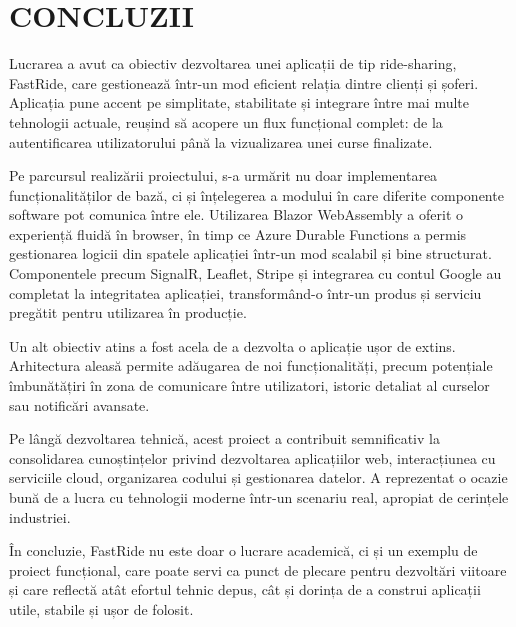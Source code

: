 \chapter{CONCLUZII}
Lucrarea a avut ca obiectiv dezvoltarea unei aplicații de tip ride-sharing, FastRide, care gestionează într-un mod eficient relația dintre clienți și șoferi. Aplicația pune accent pe simplitate, stabilitate și integrare între mai multe tehnologii actuale, reușind să acopere un flux funcțional complet: de la autentificarea utilizatorului până la vizualizarea unei curse finalizate.

Pe parcursul realizării proiectului, s-a urmărit nu doar implementarea funcționalităților de bază, ci și înțelegerea a modului în care diferite componente software pot comunica între ele. Utilizarea Blazor WebAssembly a oferit o experiență fluidă în browser, în timp ce Azure Durable Functions a permis gestionarea logicii din spatele aplicației într-un mod scalabil și bine structurat. Componentele precum SignalR, Leaflet, Stripe și integrarea cu contul Google au completat la integritatea aplicației, transformând-o într-un produs și serviciu pregătit pentru utilizarea în producție.

Un alt obiectiv atins a fost acela de a dezvolta o aplicație ușor de extins. Arhitectura aleasă permite adăugarea de noi funcționalități, precum potențiale îmbunătățiri în zona de comunicare între utilizatori, istoric detaliat al curselor sau notificări avansate.

Pe lângă dezvoltarea tehnică, acest proiect a contribuit semnificativ la consolidarea cunoștințelor privind dezvoltarea aplicațiilor web, interacțiunea cu serviciile cloud, organizarea codului și gestionarea datelor. A reprezentat o ocazie bună de a lucra cu tehnologii moderne într-un scenariu real, apropiat de cerințele industriei.

În concluzie, FastRide nu este doar o lucrare academică, ci și un exemplu de proiect funcțional, care poate servi ca punct de plecare pentru dezvoltări viitoare și care reflectă atât efortul tehnic depus, cât și dorința de a construi aplicații utile, stabile și ușor de folosit.